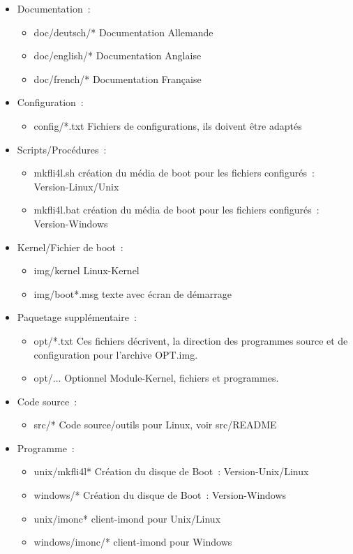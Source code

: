 \begin{itemize}
\item Documentation~:
  \begin{itemize}
  \item doc/deutsch/* Documentation Allemande
  \item doc/english/* Documentation Anglaise
  \item doc/french/* Documentation Française
  \end{itemize}

\item Configuration~:
  \begin{itemize}
  \item config/*.txt Fichiers de configurations, ils doivent être adaptés
  \end{itemize}

\item Scripts/Procédures~:
  \begin{itemize}
  \item mkfli4l.sh création du média de boot pour les fichiers configurés~:
    Version-Linux/Unix
  \item mkfli4l.bat création du média de boot pour les fichiers configurés~:
    Version-Windows
  \end{itemize}

\item Kernel/Fichier de boot~:
  \begin{itemize}
  \item img/kernel Linux-Kernel
  \item img/boot*.msg texte avec écran de démarrage
  \end{itemize}

\item Paquetage supplémentaire~:
  \begin{itemize}
  \item opt/*.txt Ces fichiers décrivent, la direction des programmes source
    et de configuration pour l'archive OPT.img.
  \item opt/... Optionnel Module-Kernel, fichiers et programmes.
  \end{itemize}

\item Code source~:
  \begin{itemize}
  \item src/* Code source/outils pour Linux, voir src/README
  \end{itemize}

\item Programme~:
  \begin{itemize}
  \item unix/mkfli4l* Création du disque de Boot~: Version-Unix/Linux
  \item windows/* Création du disque de Boot~: Version-Windows
  \item unix/imonc* client-imond pour Unix/Linux
  \item windows/imonc/* client-imond pour Windows
  \end{itemize}
\end{itemize}


